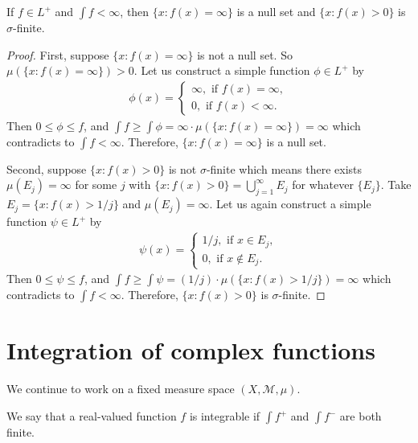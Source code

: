 \begin{proposition}
    If $f \in L^+$ and $\int f < \infty$, then $\{ x: f(x) = \infty \}$ is a null set and $\{ x: f(x) > 0 \}$ is $\sigma$-finite. 
\end{proposition}

\begin{proof}
    First, suppose $\{ x : f(x) = \infty \}$ is not a null set.
    So $\mu(\{ x : f(x) = \infty \}) > 0$. 
    Let us construct a simple function $\phi \in L^+$ by
    \begin{align}
        \phi(x) = \begin{cases}
            \infty, \text{ if } f(x) = \infty, \\
            0, \text{ if } f(x) < \infty.
        \end{cases}
    \end{align}
    Then $0 \le \phi \le f$, and $\int f \ge \int \phi = \infty \cdot \mu(\{ x : f(x) = \infty \}) = \infty$ which contradicts to $\int f < \infty$.
    Therefore, $\{ x : f(x) = \infty \}$ is a null set.

    Second, suppose $\{ x: f(x) > 0 \}$ is not $\sigma$-finite which means there exists $\mu(E_j) = \infty$ for some $j$ with $\{ x: f(x) > 0 \} = \bigcup_{j=1}^{\infty} E_j$ for whatever $\{ E_j \}$.
    Take $E_j = \{ x: f(x) > 1/j \}$ and $\mu(E_j) = \infty$.
    Let us again construct a simple function $\psi \in L^+$ by
    \begin{align}
        \psi(x) = \begin{cases}
            1/j, \text{ if } x \in E_j, \\
            0, \text{ if } x \notin E_j.
        \end{cases}
    \end{align} 
    Then $0 \le \psi \le f$, and $\int f \ge \int \psi = (1/j) \cdot \mu(\{ x : f(x) > 1/j \}) = \infty$ which contradicts to $\int f < \infty$.
    Therefore, $\{ x: f(x) > 0 \}$ is $\sigma$-finite.
\end{proof}

\section{Integration of complex functions}

We continue to work on a fixed measure space $(X, \mathcal{M}, \mu)$.


\begin{definition}
    We say that a real-valued function $f$ is integrable if $\int f^+$ and $\int f^-$ are both finite.
\end{definition}

